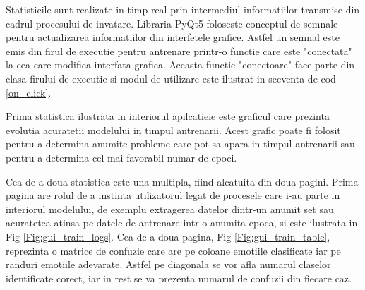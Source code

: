\documentclass[a4paper,12pt]{book}
\begin{document}
		Statisticile sunt realizate in timp real prin intermediul informatiilor transmise din cadrul procesului de invatare. Libraria PyQt5 foloseste conceptul de semnale pentru actualizarea informatiilor din interfetele grafice. Astfel un semnal este emis din firul de executie pentru antrenare printr-o functie care este "conectata" la cea care modifica interfata grafica. Aceasta functie "conectoare" face parte din clasa firului de executie si modul de utilizare este ilustrat in 
		secventa de cod \ref{on_click}. \par
		Prima statistica ilustrata in interiorul apilcatieie este graficul care prezinta evolutia acuratetii modelului in timpul antrenarii. Acest grafic poate fi folosit pentru a determina anumite probleme care pot sa apara in timpul antrenarii sau pentru a determina cel mai favorabil numar de epoci. \par
		Cea de a doua statistica este una multipla, fiind alcatuita din doua pagini. Prima pagina are rolul de a instinta utilizatorul legat de procesele care i-au parte in interiorul modelului, de exemplu extragerea datelor dintr-un anumit set sau acuratetea atinsa pe datele de antrenare intr-o anumita epoca, si este ilustrata in Fig \ref{Fig:gui_train_logs}. Cea de a doua pagina, Fig \ref{Fig:gui_train_table}, reprezinta o matrice de confuzie care are pe coloane emotiile clasificate iar pe randuri emotiile adevarate. Astfel pe diagonala se vor afla numarul claselor identificate corect, iar in rest se va prezenta numarul de confuzii din fiecare caz.  
\end{document}
